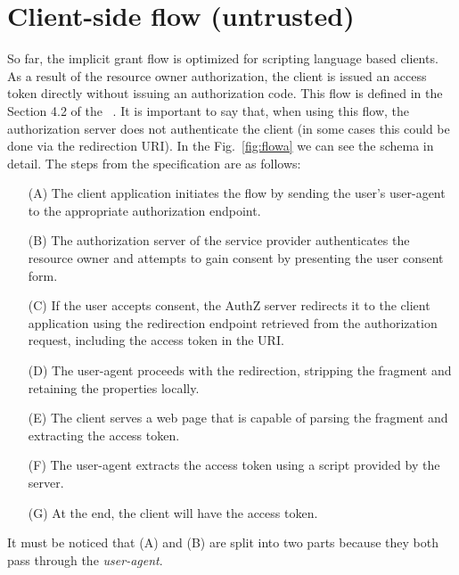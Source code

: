 \section{Client-side flow (untrusted)}
So far, the implicit grant flow is optimized for scripting language based clients. As a result of the resource owner authorization, the client is issued an access token directly without issuing an authorization code. This flow is defined in the Section 4.2 of the \ \cite{RFC6749}. It is important to say that, when using this flow, the authorization server does not authenticate the client (in some cases this could be done via the redirection URI). In the Fig.~\ref{fig:flowa} we can see the schema in detail. The steps from the specification are as follows:

\begin{itemize}
    \item[(A)]The client application initiates the flow by sending the user's user-agent to the appropriate authorization endpoint.
    \item[(B)]The authorization server of the service provider authenticates the resource owner and attempts to gain consent by presenting the user consent form.
    \item[(C)]If the user accepts consent, the AuthZ server redirects it to the client application using the redirection endpoint retrieved from the authorization request, including the access token in the URI.
    \item[(D)]The user-agent proceeds with the redirection, stripping the fragment and retaining the properties locally.
    \item[(E)]The client serves a web page that is capable of parsing the fragment and extracting the access token.
    \item[(F)]The user-agent extracts the access token using a script provided by the server.
    \item[(G)] At the end, the client will have the access token.
\end{itemize}

It must be noticed that (A) and (B) are split into two parts because they both pass through the \textit{user-agent}.

